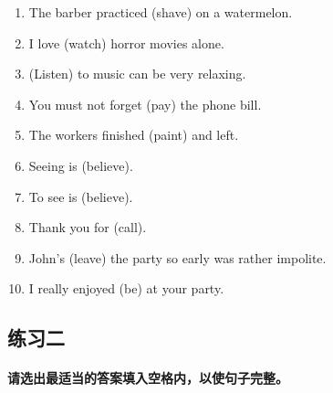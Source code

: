 \begin{enumerate}
\item The barber practiced \ttu (shave) on a watermelon.

\item I love \ttu (watch) horror movies alone.

\item \ttu (Listen) to music can be very relaxing.

\item You must not forget \ttu (pay) the phone bill.

\item The workers finished \ttu (paint) and left.

\item Seeing is \ttu (believe).

\item To see is \ttu (believe).

\item Thank you for \ttu (call).

\item John's \ttu (leave) the party so early was rather impolite.

\item I really enjoyed \ttu (be) at your party.
\end{enumerate}


\subsection{练习二}

\paragraph{请选出最适当的答案填入空格内，以使句子完整。}

